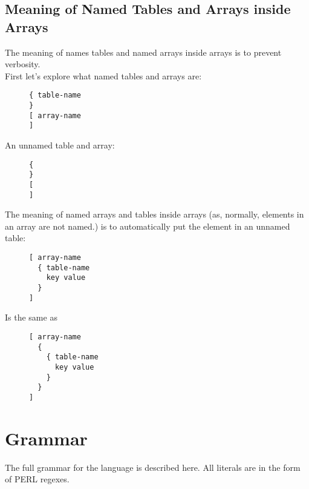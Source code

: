 \documentclass[listof=totoc]{article}
\begin{document}
\subsection{Meaning of Named Tables and Arrays inside Arrays}
\noindent The meaning of names tables and named arrays inside arrays is to prevent verbosity. \\
\noindent First let's explore what named tables and arrays are:

\begin{figure}[H]
\centering
\begin{varwidth}{\linewidth}
\begin{verbatim}
{ table-name
}
[ array-name
]
\end{verbatim}
\end{varwidth}
\caption{}
\end{figure}

An unnamed table and array:

\begin{figure}[H]
\centering
\begin{varwidth}{\linewidth}
\begin{verbatim}
{
}
[
]
\end{verbatim}
\end{varwidth}
\caption{}
\end{figure}

The meaning of named arrays and tables inside arrays (as, normally, elements in an array are not named.) is to automatically put the element in an unnamed table:

\begin{figure}[H]
\centering
\begin{varwidth}{\linewidth}
\begin{verbatim}
[ array-name
  { table-name
    key value
  }
]
\end{verbatim}
\end{varwidth}
\caption{}
\end{figure}

Is the same as

\begin{figure}[H]
\centering
\begin{varwidth}{\linewidth}
\begin{verbatim}
[ array-name
  {
    { table-name
      key value
    }
  }
]
\end{verbatim}
\end{varwidth}
\caption{}
\end{figure}

\section{Grammar}
\noindent The full grammar for the language is described here. All literals are in the form of PERL regexes.
\end{document}
